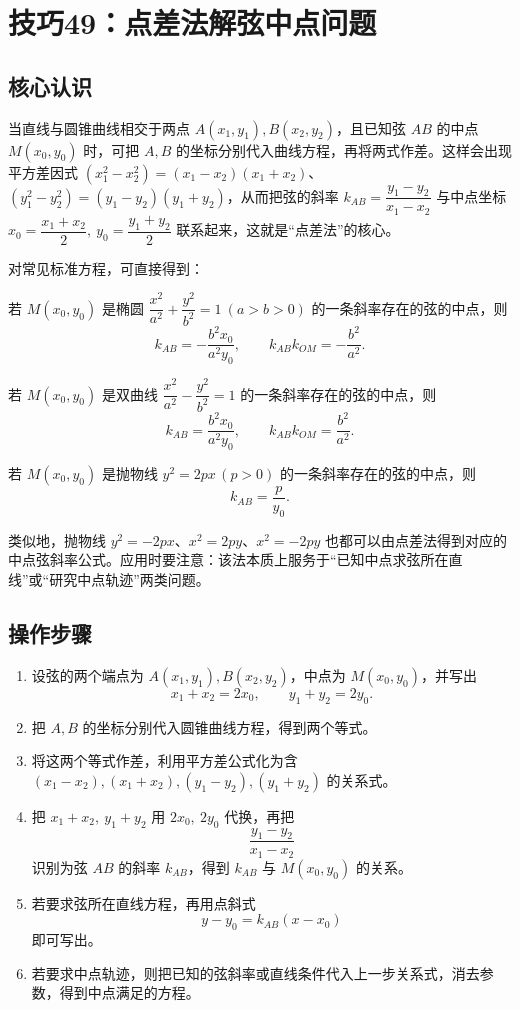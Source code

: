 \documentclass[UTF8,a4paper,11pt]{ctexart}
\begin{document}
\clearpage

\section{技巧49：点差法解弦中点问题}

\subsection*{核心认识}

当直线与圆锥曲线相交于两点 $A(x_1,y_1),B(x_2,y_2)$，且已知弦 $AB$ 的中点 $M(x_0,y_0)$ 时，可把 $A,B$ 的坐标分别代入曲线方程，再将两式作差。这样会出现平方差因式 $(x_1^2-x_2^2)=(x_1-x_2)(x_1+x_2)$、$(y_1^2-y_2^2)=(y_1-y_2)(y_1+y_2)$，从而把弦的斜率 $k_{AB}=\dfrac{y_1-y_2}{x_1-x_2}$ 与中点坐标 $x_0=\dfrac{x_1+x_2}{2},\ y_0=\dfrac{y_1+y_2}{2}$ 联系起来，这就是“点差法”的核心。

对常见标准方程，可直接得到：

若 $M(x_0,y_0)$ 是椭圆 $\dfrac{x^2}{a^2}+\dfrac{y^2}{b^2}=1\ (a>b>0)$ 的一条斜率存在的弦的中点，则
\[
k_{AB}=-\frac{b^2x_0}{a^2y_0},\qquad k_{AB}k_{OM}=-\frac{b^2}{a^2}.
\]

若 $M(x_0,y_0)$ 是双曲线 $\dfrac{x^2}{a^2}-\dfrac{y^2}{b^2}=1$ 的一条斜率存在的弦的中点，则
\[
k_{AB}=\frac{b^2x_0}{a^2y_0},\qquad k_{AB}k_{OM}=\frac{b^2}{a^2}.
\]

若 $M(x_0,y_0)$ 是抛物线 $y^2=2px\,(p>0)$ 的一条斜率存在的弦的中点，则
\[
k_{AB}=\frac{p}{y_0}.
\]

类似地，抛物线 $y^2=-2px$、$x^2=2py$、$x^2=-2py$ 也都可以由点差法得到对应的中点弦斜率公式。应用时要注意：该法本质上服务于“已知中点求弦所在直线”或“研究中点轨迹”两类问题。

\subsection*{操作步骤}

\begin{enumerate}

\item 设弦的两个端点为 $A(x_1,y_1),B(x_2,y_2)$，中点为 $M(x_0,y_0)$，并写出
\[
x_1+x_2=2x_0,\qquad y_1+y_2=2y_0.
\]

\item 把 $A,B$ 的坐标分别代入圆锥曲线方程，得到两个等式。

\item 将这两个等式作差，利用平方差公式化为含 $(x_1-x_2),(x_1+x_2),(y_1-y_2),(y_1+y_2)$ 的关系式。

\item 把 $x_1+x_2,\ y_1+y_2$ 用 $2x_0,\ 2y_0$ 代换，再把
\[
\frac{y_1-y_2}{x_1-x_2}
\]
识别为弦 $AB$ 的斜率 $k_{AB}$，得到 $k_{AB}$ 与 $M(x_0,y_0)$ 的关系。

\item 若要求弦所在直线方程，再用点斜式
\[
y-y_0=k_{AB}(x-x_0)
\]
即可写出。

\item 若要求中点轨迹，则把已知的弦斜率或直线条件代入上一步关系式，消去参数，得到中点满足的方程。

\end{enumerate}
\end{document}
